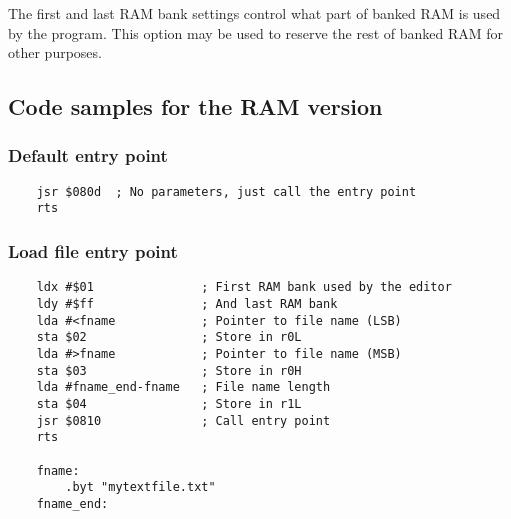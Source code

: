 \documentclass{article}
\begin{document}
        The first and last RAM bank settings control what part of banked RAM is
        used by the program. This option may be used to reserve the rest of banked RAM
        for other purposes.

    \subsection{Code samples for the RAM version}

    \subsubsection{Default entry point}
\begin{verbatim}
    jsr $080d  ; No parameters, just call the entry point
    rts
\end{verbatim}

    \subsubsection{Load file entry point}
\begin{verbatim}
    ldx #$01               ; First RAM bank used by the editor
    ldy #$ff               ; And last RAM bank
    lda #<fname            ; Pointer to file name (LSB)
    sta $02                ; Store in r0L
    lda #>fname            ; Pointer to file name (MSB)
    sta $03                ; Store in r0H
    lda #fname_end-fname   ; File name length
    sta $04                ; Store in r1L
    jsr $0810              ; Call entry point
    rts

    fname:
        .byt "mytextfile.txt"
    fname_end:
\end{verbatim}
\end{document}
